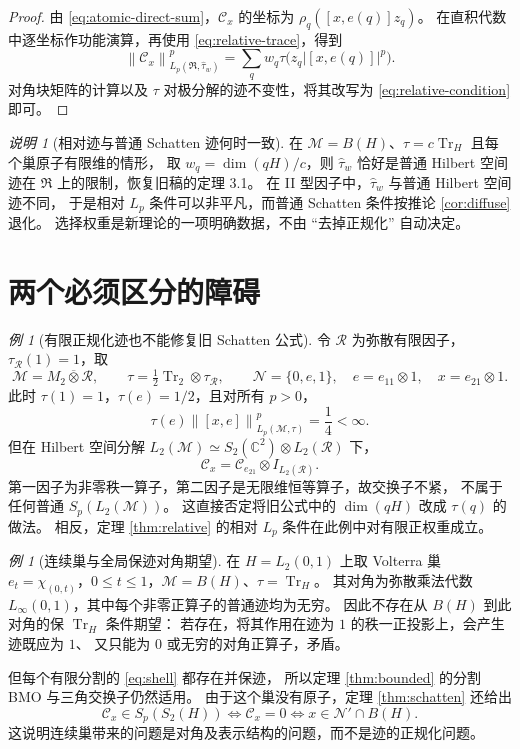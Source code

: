 \documentclass[UTF8,11pt,a4paper,fontset=fandol]{ctexart}
\theoremstyle{remark}
\newtheorem{remark}[theorem]{说明}
\newtheorem{example}[theorem]{例}
\numberwithin{equation}{section}
\newcommand{\M}{\mathcal M}
\newcommand{\N}{\mathcal N}
\newcommand{\CC}{\mathcal C}
\newcommand{\Tr}{\operatorname{Tr}}
\newcommand{\norm}[1]{\left\lVert #1\right\rVert}
\begin{document}
\begin{proof}
由 \eqref{eq:atomic-direct-sum}，$\CC_x$ 的坐标为
$\rho_q([x,e(q)]z_q)$。
在直积代数中逐坐标作功能演算，再使用 \eqref{eq:relative-trace}，得到
\[
 \norm{\CC_x}_{L_p(\mathfrak R,\widehat\tau_w)}^p
 =\sum_qw_q\tau\bigl(z_q|[x,e(q)]|^p\bigr).
\]
对角块矩阵的计算以及 $\tau$ 对极分解的迹不变性，将其改写为
\eqref{eq:relative-condition} 即可。
\end{proof}

\begin{remark}[相对迹与普通 Schatten 迹何时一致]
在 $\M=B(H)$、$\tau=c\Tr_H$ 且每个巢原子有限维的情形，
取 $w_q=\dim(qH)/c$，则 $\widehat\tau_w$ 恰好是普通 Hilbert 空间迹在
$\mathfrak R$ 上的限制，恢复旧稿的定理 3.1。
在 II 型因子中，$\widehat\tau_w$ 与普通 Hilbert 空间迹不同，
于是相对 $L_p$ 条件可以非平凡，而普通 Schatten 条件按推论 \ref{cor:diffuse} 退化。
选择权重是新理论的一项明确数据，不由 ``去掉正规化'' 自动决定。
\end{remark}

\section{两个必须区分的障碍}

\begin{example}[有限正规化迹也不能修复旧 Schatten 公式]\label{ex:II}
令 $\mathcal R$ 为弥散有限因子，$\tau_{\mathcal R}(1)=1$，取
\[
 \M=M_2\overline\otimes\mathcal R,\qquad
 \tau=\tfrac12\Tr_2\otimes\tau_{\mathcal R},\qquad
 \N=\{0,e,1\},\quad e=e_{11}\otimes1,\quad x=e_{21}\otimes1.
\]
此时 $\tau(1)=1$，$\tau(e)=1/2$，且对所有 $p>0$，
\[
 \tau(e)\norm{[x,e]}_{L_p(\M,\tau)}^p=\frac14<\infty.
\]
但在 Hilbert 空间分解
$L_2(\M)\simeq S_2(\mathbb C^2)\otimes L_2(\mathcal R)$ 下，
\[
 \CC_x=\CC_{e_{21}}\otimes I_{L_2(\mathcal R)}.
\]
第一因子为非零秩一算子，第二因子是无限维恒等算子，故交换子不紧，
不属于任何普通 $S_p(L_2(\M))$。
这直接否定将旧公式中的 $\dim(qH)$ 改成 $\tau(q)$ 的做法。
相反，定理 \ref{thm:relative} 的相对 $L_p$ 条件在此例中对有限正权重成立。
\end{example}

\begin{example}[连续巢与全局保迹对角期望]
在 $H=L_2(0,1)$ 上取 Volterra 巢
$e_t=\chi_{(0,t)}$，$0\leq t\leq1$，$\M=B(H)$、$\tau=\Tr_H$。
其对角为弥散乘法代数 $L_\infty(0,1)$，其中每个非零正算子的普通迹均为无穷。
因此不存在从 $B(H)$ 到此对角的保 $\Tr_H$ 条件期望：
若存在，将其作用在迹为 $1$ 的秩一正投影上，会产生迹既应为 $1$、
又只能为 $0$ 或无穷的对角正算子，矛盾。

但每个有限分割的 \eqref{eq:shell} 都存在并保迹，
所以定理 \ref{thm:bounded} 的分割 BMO 与三角交换子仍然适用。
由于这个巢没有原子，定理 \ref{thm:schatten} 还给出
\[
 \CC_x\in S_p(S_2(H))
 \iff\CC_x=0
 \iff x\in\N'\cap B(H).
\]
这说明连续巢带来的问题是对角及表示结构的问题，而不是迹的正规化问题。
\end{example}
\end{document}
